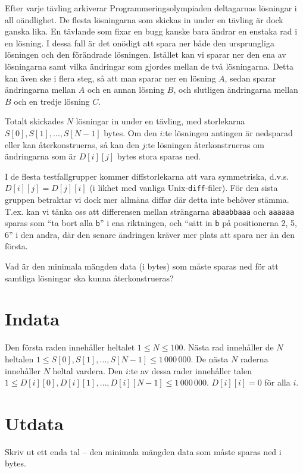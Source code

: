 Efter varje tävling arkiverar Programmeringsolympiaden deltagarnas lösningar i all oändlighet.
De flesta lösningarna som skickas in under en tävling är dock ganska lika.
En tävlande som fixar en bugg kanske bara ändrar en enstaka rad i en lösning.
I dessa fall är det onödigt att spara ner både den ursprungliga lösningen och den förändrade lösningen.
Istället kan vi sparar ner den ena av lösningarna samt vilka ändringar som gjordes mellan de två lösningarna.
Detta kan även ske i flera steg, så att man sparar ner en lösning $A$, sedan sparar ändringarna mellan $A$ och en annan lösning $B$, och slutligen ändringarna mellan $B$ och en tredje lösning $C$.

Totalt skickades $N$ lösningar in under en tävling, med storlekarna $S[0], S[1], \dots, S[N-1]$ bytes.
Om den $i$:te lösningen antingen är nedsparad eller kan återkonstrueras, så kan den $j$:te lösningen återkonstrueras om ändringarna som är $D[i][j]$ bytes stora sparas ned.

I de flesta testfallgrupper kommer diffstorlekarna att vara symmetriska, d.v.s. $D[i][j] = D[j][i]$ (i likhet med vanliga Unix-\texttt{diff}-filer).
För den sista gruppen betraktar vi dock mer allmäna diffar där detta inte behöver stämma.
T.ex. kan vi tänka oss att differensen mellan strängarna \texttt{abaabbaaa} och \texttt{aaaaaa} sparas som ``ta bort alla \texttt{b}'' i ena riktningen, och ``sätt in \texttt{b} på positionerna 2, 5, 6'' i den andra, där den senare ändringen kräver mer plats att spara ner än den första.

Vad är den minimala mängden data (i bytes) som måste sparas ned för att samtliga lösningar ska kunna återkonstrueras?

\section*{Indata}
Den första raden innehåller heltalet $1 \le N \le 100$.
Nästa rad innehåller de $N$ heltalen $1 \le S[0], S[1], \dots, S[N-1] \le 1\,000\,000$.
De nästa $N$ raderna innehåller $N$ heltal vardera.
Den $i$:te av dessa rader innehåller talen $1 \le D[i][0], D[i][1], \dots, D[i][N-1] \le 1\,000\,000$.
$D[i][i] = 0$ för alla $i$.

\section*{Utdata}
Skriv ut ett enda tal -- den minimala mängden data som måste sparas ned i bytes.

